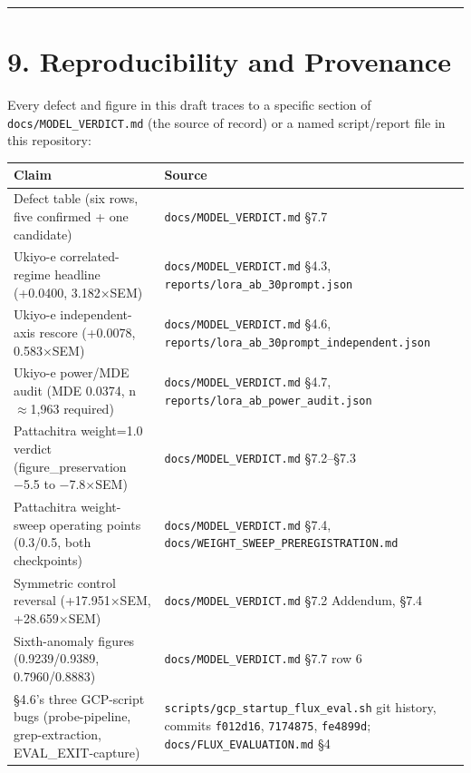 \begin{center}\rule{0.5\linewidth}{0.5pt}\end{center}

\hypertarget{reproducibility-and-provenance}{%
\section{9. Reproducibility and
Provenance}\label{reproducibility-and-provenance}}

Every defect and figure in this draft traces to a specific section of
\texttt{docs/MODEL\_VERDICT.md} (the source of record) or a named
script/report file in this repository:

\begin{longtable}[]{@{}
  >{\raggedright\arraybackslash}p{}
  >{\raggedright\arraybackslash}p{}@{}}
\toprule
Claim & Source \\
\midrule
\endhead
Defect table (six rows, five confirmed + one candidate) &
\texttt{docs/MODEL\_VERDICT.md} §7.7 \\
Ukiyo-e correlated-regime headline (+0.0400, 3.182×SEM) &
\texttt{docs/MODEL\_VERDICT.md} §4.3,
\texttt{reports/lora\_ab\_30prompt.json} \\
Ukiyo-e independent-axis rescore (+0.0078, 0.583×SEM) &
\texttt{docs/MODEL\_VERDICT.md} §4.6,
\texttt{reports/lora\_ab\_30prompt\_independent.json} \\
Ukiyo-e power/MDE audit (MDE 0.0374, n$\approx$1,963 required) &
\texttt{docs/MODEL\_VERDICT.md} §4.7,
\texttt{reports/lora\_ab\_power\_audit.json} \\
Pattachitra weight=1.0 verdict (figure\_preservation −5.5 to −7.8×SEM) &
\texttt{docs/MODEL\_VERDICT.md} §7.2--§7.3 \\
Pattachitra weight-sweep operating points (0.3/0.5, both checkpoints) &
\texttt{docs/MODEL\_VERDICT.md} §7.4,
\texttt{docs/WEIGHT\_SWEEP\_PREREGISTRATION.md} \\
Symmetric control reversal (+17.951×SEM, +28.659×SEM) &
\texttt{docs/MODEL\_VERDICT.md} §7.2 Addendum, §7.4 \\
Sixth-anomaly figures (0.9239/0.9389, 0.7960/0.8883) &
\texttt{docs/MODEL\_VERDICT.md} §7.7 row 6 \\
§4.6's three GCP-script bugs (probe-pipeline, grep-extraction,
EVAL\_EXIT-capture) & \texttt{scripts/gcp\_startup\_flux\_eval.sh} git
history, commits \texttt{f012d16}, \texttt{7174875}, \texttt{fe4899d};
\texttt{docs/FLUX\_EVALUATION.md} §4 \\
\bottomrule
\end{longtable}

